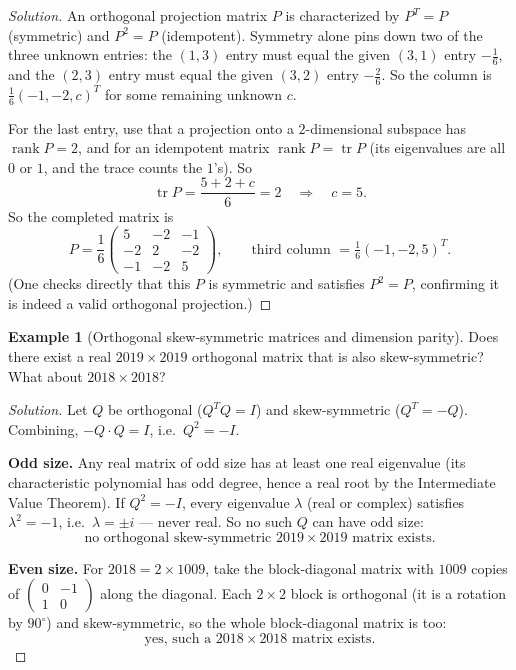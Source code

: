 \documentclass[11pt]{article}
\theoremstyle{definition}
\newtheorem{example}{Example}[section]
\newcommand{\rank}{\operatorname{rank}}
\newcommand{\trace}{\operatorname{tr}}
\begin{document}
\begin{proof}[Solution]
An orthogonal projection matrix $P$ is characterized by $P^T=P$ (symmetric) and $P^2=P$ (idempotent). Symmetry alone pins down two of the three unknown entries: the $(1,3)$ entry must equal the given $(3,1)$ entry $-\tfrac16$, and the $(2,3)$ entry must equal the given $(3,2)$ entry $-\tfrac26$. So the column is $\tfrac16(-1,-2,c)^T$ for some remaining unknown $c$.

For the last entry, use that a projection onto a $2$-dimensional subspace has $\rank P=2$, and for an idempotent matrix $\rank P=\trace P$ (its eigenvalues are all $0$ or $1$, and the trace counts the $1$'s). So
\[
\trace P = \frac{5+2+c}{6}=2 \quad\Longrightarrow\quad c=5.
\]
So the completed matrix is
\[
P=\frac16\begin{pmatrix}5&-2&-1\\-2&2&-2\\-1&-2&5\end{pmatrix}, \qquad \boxed{\text{third column } = \tfrac16(-1,-2,5)^T}.
\]
(One checks directly that this $P$ is symmetric and satisfies $P^2=P$, confirming it is indeed a valid orthogonal projection.)
\end{proof}

\begin{example}[Orthogonal skew-symmetric matrices and dimension parity]
Does there exist a real $2019\times2019$ orthogonal matrix that is also skew-symmetric? What about $2018\times2018$?
\end{example}

\begin{proof}[Solution]
Let $Q$ be orthogonal ($Q^TQ=I$) and skew-symmetric ($Q^T=-Q$). Combining, $-Q\cdot Q=I$, i.e.\ $Q^2=-I$.

\textbf{Odd size.} Any real matrix of odd size has at least one real eigenvalue (its characteristic polynomial has odd degree, hence a real root by the Intermediate Value Theorem). If $Q^2=-I$, every eigenvalue $\lambda$ (real or complex) satisfies $\lambda^2=-1$, i.e.\ $\lambda=\pm i$ — never real. So no such $Q$ can have odd size:
\[
\boxed{\text{no orthogonal skew-symmetric } 2019\times2019 \text{ matrix exists}}.
\]

\textbf{Even size.} For $2018=2\times1009$, take the block-diagonal matrix with $1009$ copies of $\begin{pmatrix}0&-1\\1&0\end{pmatrix}$ along the diagonal. Each $2\times2$ block is orthogonal (it is a rotation by $90^\circ$) and skew-symmetric, so the whole block-diagonal matrix is too:
\[
\boxed{\text{yes, such a } 2018\times2018 \text{ matrix exists}}.
\]
\end{proof}
\end{document}
